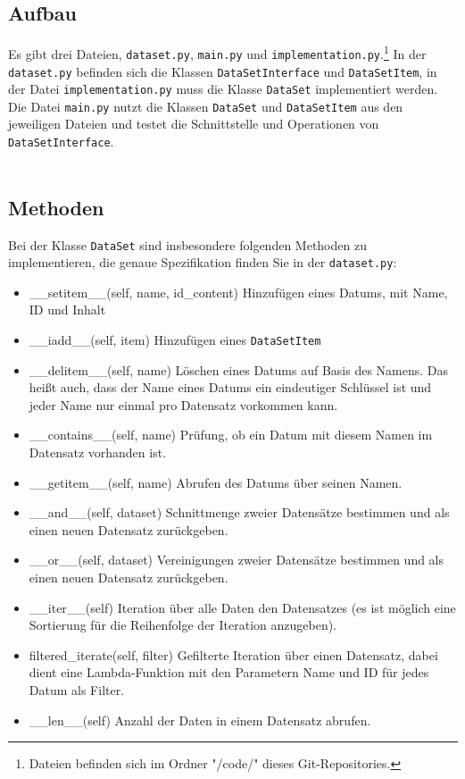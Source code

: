 \documentclass[
    12pt, %
    a4paper, %
    parskip=full, %
    ]{scrartcl}
\begin{document}
        \subsection{Aufbau}
        Es gibt drei Dateien, \texttt{dataset.py}, \texttt{main.py} und \texttt{implementation.py}.\footnote{Dateien befinden sich im Ordner "/code/" dieses Git-Repositories.}
        In der \texttt{dataset.py} befinden sich die Klassen \texttt{DataSetInterface} und \texttt{DataSetItem},
        in der Datei \texttt{implementation.py} muss die Klasse \texttt{DataSet} implementiert werden.
        Die Datei \texttt{main.py} nutzt die Klassen \texttt{DataSet} und \texttt{DataSetItem} aus den jeweiligen Dateien und testet die Schnittstelle und Operationen von \texttt{DataSetInterface}.\\
        \\
        \subsection{Methoden}
        Bei der Klasse \texttt{DataSet} sind insbesondere folgenden Methoden zu implementieren, die genaue Spezifikation finden Sie in der \texttt{dataset.py}:\\
        \begin{itemize}
             \item \_\_setitem\_\_(self, name, id\_content)
             Hinzufügen eines Datums, mit Name, ID und Inhalt
            \item \_\_iadd\_\_(self, item)
            Hinzufügen eines \texttt{DataSetItem}
            \item \_\_delitem\_\_(self, name)
            Löschen eines Datums auf Basis des Namens.
            Das heißt auch, dass der Name eines Datums ein eindeutiger Schlüssel ist und jeder Name nur einmal pro Datensatz vorkommen kann.
            \item \_\_contains\_\_(self, name)
            Prüfung, ob ein Datum mit diesem Namen im Datensatz vorhanden ist.
            \item \_\_getitem\_\_(self, name)
            Abrufen des Datums über seinen Namen.
            \item \_\_and\_\_(self, dataset)
            Schnittmenge zweier Datensätze bestimmen und als einen neuen Datensatz zurückgeben.
            \item \_\_or\_\_(self, dataset)
            Vereinigungen zweier Datensätze bestimmen und als einen neuen Datensatz zurückgeben.
            \item \_\_iter\_\_(self)
            Iteration über alle Daten den Datensatzes (es ist möglich eine Sortierung für die Reihenfolge der Iteration anzugeben).
            \item filtered\_iterate(self, filter)
            Gefilterte Iteration über einen Datensatz, dabei dient eine Lambda-Funktion mit den Parametern Name und ID für jedes Datum als Filter.
            \item \_\_len\_\_(self)
            Anzahl der Daten in einem Datensatz abrufen.
            
        \end{itemize}
        
\end{document}
